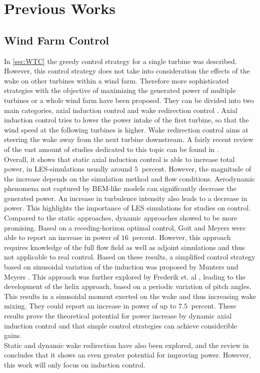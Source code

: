 \section{Previous Works}
\subsection{Wind Farm Control}
In \autoref{sec:WTC} the greedy control strategy for a single turbine was described. However, this control strategy does not take into consideration the effects of the wake on other turbines within a wind farm. Therefore more sophisticated strategies with the objective of maximizing the generated power of multiple turbines or a whole wind farm have been proposed. They can be divided into two main categories, axial induction control and wake redirection control \cite{boersma_tutorial_2017}.
Axial induction control tries to lower the power intake of the first turbine, so that the wind speed at the following turbines is higher. Wake redirection control aims at steering the wake away from the next turbine downstream. A fairly recent review of the vast amount of studies dedicated to this topic can be found in \cite{kheirabadi_quantitative_2019}. \\
Overall, it shows that static axial induction control is able to increase total power, in LES-simulations usually around $\SI{5}{}$ percent. However, the magnitude of the increase depends on the simulation method and flow conditions. Aerodynamic phenomena not captured by BEM-like models can significantly decrease the generated power. An increase in turbulence intensity also leads to a decrease in power. This highlights the importance of LES simulations for studies on control.
Compared to the static approaches, dynamic approaches showed to be more promising. Based on a receding-horizon optimal control, Goit and Meyers \cite{goit_optimal_2015} were able to report an increase in power of $\SI{16}{}$ percent. However, this approach requires knowledge of the full flow field as well as adjoint simulations and thus not applicable to real control. Based on these results, a simplified control strategy based on sinusoidal variation of the induction was proposed by Munters und Meyers \cite{munters_towards_2018}. This approach was further explored by Frederik et. al \cite{frederik_helix_2020}, leading to the development of the helix approach, based on a periodic variation of pitch angles. This results in a sinusoidal moment exerted on the wake and thus increasing wake mixing. They could report an increase in power of up to $\SI{7.5}{}$ percent. These results prove the theoretical potential for power increase by dynamic axial induction control and that simple control strategies can achieve considerible gains. \\
Static and dynamic wake redirection have also been explored, and the review in \cite{kheirabadi_quantitative_2019} concludes that it shows an even greater potential for improving power. However, this work will only focus on induction control.
